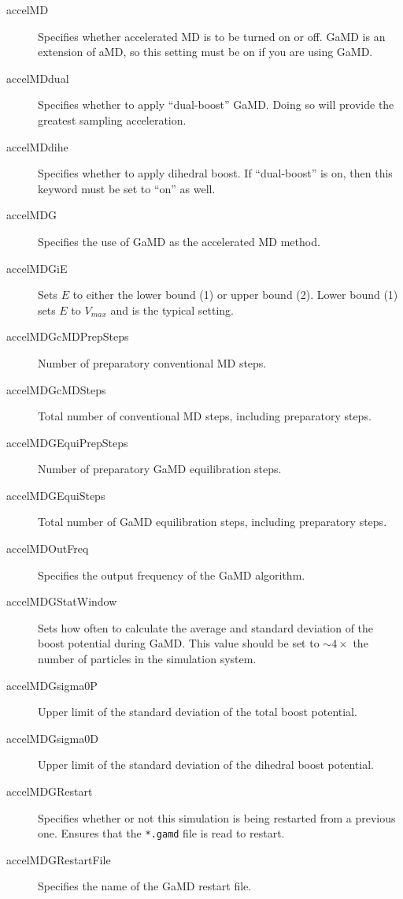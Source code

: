 \documentclass[9pt,tutorial,pubversion]{livecoms}
\begin{document}
\begin{description}
    \item[accelMD] Specifies whether accelerated MD is to be turned on or off. GaMD is an extension of aMD, so this setting must be on if you are using GaMD.
    \item[accelMDdual] Specifies whether to apply ``dual-boost'' GaMD. Doing so will provide the greatest sampling acceleration.
    \item[accelMDdihe] Specifies whether to apply dihedral boost. If ``dual-boost'' is on, then this keyword must be set to ``on'' as well. 
    \item[accelMDG] Specifies the use of GaMD as the accelerated MD method.
    \item[accelMDGiE] Sets $E$ to either the lower bound (1) or upper bound (2). Lower bound (1) sets $E$ to $V_{max}$ and is the typical setting.
    \item[accelMDGcMDPrepSteps] Number of preparatory conventional MD steps.
    \item[accelMDGcMDSteps] Total number of conventional MD steps, including preparatory steps.
    \item[accelMDGEquiPrepSteps] Number of preparatory GaMD equilibration steps.
    \item[accelMDGEquiSteps] Total number of GaMD equilibration steps, including preparatory steps.
    \item[accelMDOutFreq] Specifies the output frequency of the GaMD algorithm.
    \item[accelMDGStatWindow]  Sets how often to calculate the average and standard deviation of the boost potential during GaMD. This value should be set to $\sim4\times$ the number of particles in the simulation system.
    \item[accelMDGsigma0P] Upper limit of the standard deviation of the total boost potential.
    \item[accelMDGsigma0D] Upper limit of the standard deviation of the dihedral boost potential.
    \item[accelMDGRestart] Specifies whether or not this simulation is being restarted from a previous one. Ensures that the \texttt{*.gamd} file is read to restart. 
    \item[accelMDGRestartFile] Specifies the name of the GaMD restart file.
\end{description}

\bigskip
\end{document}
